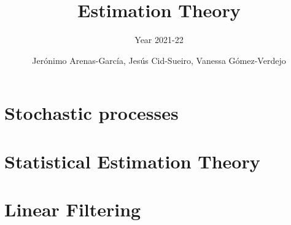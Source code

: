 \documentclass[graybox,envcountchap,sectrefs]{svmono_mod}
\begin{document}
\author{Jer\'onimo Arenas-Garc\'ia, Jes\'us Cid-Sueiro, Vanessa G\'omez-Verdejo}
\title{Estimation Theory}
\subtitle{Year 2021-22}

\frontmatter%

%
%
%
%
%

%
%
\chapter{Stochastic processes}

%
\chapter{Statistical Estimation Theory}
\label{Estimation Theory}
%
%
%
%
%
%

\chapter{Linear Filtering}
\label{cha:FiltradoLinea}
\mainmatter %
\tableofcontents


%

\backmatter%
%
%
\printindex
\end{document}
